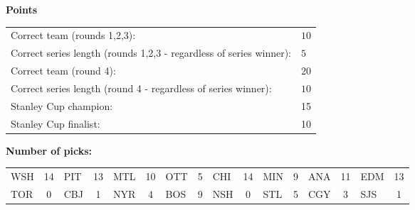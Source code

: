 \documentclass[10pt]{article}
\begin{document}
{\bf Points}\\
\begin{minipage}[t]{12cm}
    \vspace{0pt}
    \begin{tabular}{l l}
        Correct team (rounds 1,2,3):	& $10$\\
        Correct series length (rounds 1,2,3 - regardless of series winner):	& $5$\\
        Correct team (round 4):	& $20$\\
        Correct series length (round 4 - regardless of series winner):	& $10$\\
        Stanley Cup champion:	& 15\\
        Stanley Cup finalist:	& 10\\
    \end{tabular}

    \vspace{0.5cm}
    {\bf Number of picks:}\\
    \begin{tabular}{lc | lc | lc | lc | lc | lc | lc | lc }
        WSH & 14 & PIT & 13 & MTL & 10 & OTT & 5 & CHI & 14 & MIN & 9 & ANA & 11 & EDM & 13 \\
        TOR & 0 & CBJ & 1 & NYR & 4 & BOS & 9 & NSH & 0 & STL & 5 & CGY & 3 & SJS & 1 \\
    \end{tabular}
\end{minipage}
%
\end{document}
